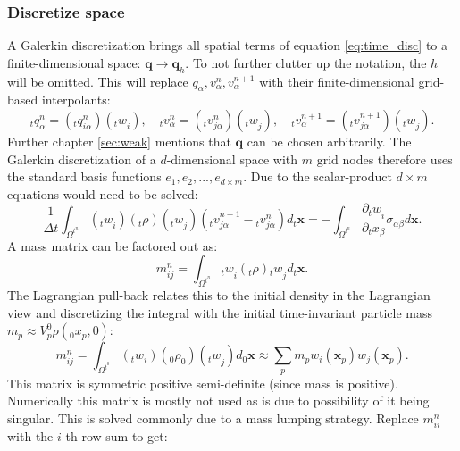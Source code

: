 \documentclass[m,times]{cgMA}
\begin{document}
\subsubsection{Discretize space}
A Galerkin discretization brings all spatial terms of equation \ref{eq:time_disc} to a finite-dimensional space: $\boldsymbol{q} \rightarrow \boldsymbol{q}_h$. To not further clutter up the notation, the $h$ will be omitted. This will replace $q_\alpha, v^n_\alpha , v_\alpha^{n+1}$ with their finite-dimensional grid-based interpolants:
\begin{equation}
  {_t q } _ { \alpha } ^ {  { n } } =  ({_t q } _ {  { i } \alpha } ^ {  { n } })  ({_t w } _ { i }) , \quad _tv _ { \alpha } ^ {  { n } } = ({_tv _ {  { j\alpha } } ^ {  { n } }} )( {_t w } _ {  { j } }) , \quad {_tv _ { \alpha } ^ {  { n } + 1 }} = ({_tv _ {  { j } \alpha } ^ {  { n } + 1 }}) ({_t w } _ {  { j } }).
\end{equation}
Further chapter \ref{sec:weak} mentions that $\boldsymbol{q}$ can be chosen arbitrarily. The Galerkin discretization of a $d$-dimensional space with $m$ grid nodes therefore uses the standard basis functions $e_1,e_2, ... ,e_{d \times m}$. Due to the scalar-product $d\times m$ equations would need to be solved:
\begin{equation}\label{eq:galerkin}
  \frac{1}{\Delta t} \int _{ \Omega^{t^n}} ({ _tw } _ {i  })(_t\rho)({_t w } _ { j  })({_tv_{j\alpha}^{n+1}}-{_tv_{j\alpha}^{n}}) d_t\boldsymbol{x} =
 - \int _ { \Omega ^ {  t^ n } }   \frac{\partial{_t w } _ { {i  }}}{\partial_tx_\beta }  \sigma _ {{ \alpha } \beta }  { d } \boldsymbol { x }.
\end{equation}
A mass matrix can be factored out as:
\begin{equation}
  m_{ij}^n = \int _{ \Omega^{t^n}} {_t w } _ {i  }(_t\rho){_t w } _ { j  } d_t\boldsymbol{x}.
\end{equation}
The Lagrangian pull-back relates this to the initial density in the Lagrangian view and discretizing the integral with the initial time-invariant particle mass $m_p \approx V_p^0\rho(_0x_p,0)$:
\begin{equation}
m_{ij}^n = \int _{ \Omega^{t^0}} ({_tw_i})(_0\rho_0)({_tw} _ { j  }) d_0 \boldsymbol{x} \approx \sum _ {  { p } }  { m } _ {  { p } }  { w } _ {  { i } } (\boldsymbol { x } _ {  { p } } )  { w } _ {  { j } } ( \boldsymbol { x } _ {  { p } } ).
\end{equation}
This matrix is symmetric positive semi-definite (since mass is positive). Numerically this matrix is mostly not used as is due to possibility of it being singular. This is solved commonly due to a mass lumping strategy. Replace $m^n_{ii}$ with the $i$-th row sum to get:
\end{document}
